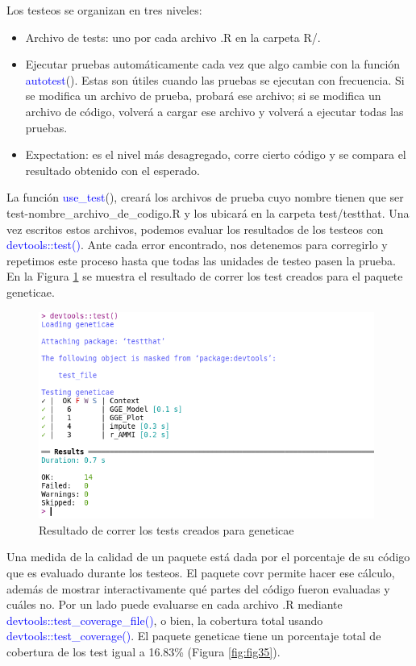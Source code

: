 Los testeos se organizan en tres niveles:
\begin{itemize}
\item Archivo de tests: uno por cada archivo .R en la carpeta R/.
\item Ejecutar pruebas automáticamente cada vez que algo cambie con la función \textcolor{blue}{autotest}(). Estas son útiles cuando las pruebas se ejecutan con frecuencia. Si se modifica un archivo de prueba, probará ese archivo; si se modifica un archivo de código, volverá a cargar ese archivo y volverá a ejecutar todas las pruebas.
\item Expectation: es el nivel más desagregado, corre cierto código y se compara el resultado obtenido con el esperado.
\end{itemize}

La función \textcolor{blue}{use\_test}(), creará los archivos de prueba cuyo nombre tienen que ser test-nombre\_archivo\_de\_codigo.R  y los ubicará en la carpeta test/testthat. Una vez escritos estos archivos, podemos evaluar los resultados de los testeos con \textcolor{blue}{devtools::test()}. Ante cada error encontrado, nos detenemos para corregirlo y repetimos este proceso hasta que todas las unidades de testeo pasen la prueba. En la Figura \ref{fig:fig34} se muestra el resultado de correr los test creados para el paquete geneticae.


 \begin{figure}[H]
	\begin{center}
		\includegraphics[width=11cm]{./Graficos/Test.png}	
	\end{center}
	\caption{Resultado de correr los tests creados para geneticae}
	\label{fig:fig34}
\end{figure}

Una medida de la calidad de un paquete está dada por el porcentaje de su código que es evaluado durante los testeos. El paquete covr permite hacer ese cálculo, además de mostrar interactivamente qué partes del código fueron evaluadas y cuáles no. Por un lado puede evaluarse en cada archivo .R mediante \textcolor{blue}{devtools::test\_coverage\_file()}, o bien, la cobertura total usando \textcolor{blue}{devtools::test\_coverage()}. El paquete geneticae tiene un porcentaje total de cobertura de los test igual a 16.83\% (Figura \ref{fig:fig35}).


